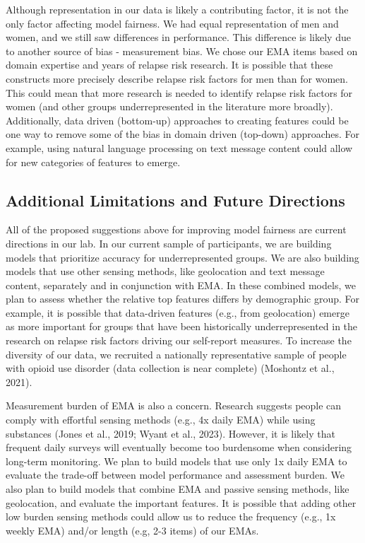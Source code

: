 \documentclass[
]{agujournal2019}
\begin{document}
Although representation in our data is likely a contributing factor, it
is not the only factor affecting model fairness. We had equal
representation of men and women, and we still saw differences in
performance. This difference is likely due to another source of bias -
measurement bias. We chose our EMA items based on domain expertise and
years of relapse risk research. It is possible that these constructs
more precisely describe relapse risk factors for men than for women.
This could mean that more research is needed to identify relapse risk
factors for women (and other groups underrepresented in the literature
more broadly). Additionally, data driven (bottom-up) approaches to
creating features could be one way to remove some of the bias in domain
driven (top-down) approaches. For example, using natural language
processing on text message content could allow for new categories of
features to emerge.

\subsection{Additional Limitations and Future
Directions}\label{additional-limitations-and-future-directions}

All of the proposed suggestions above for improving model fairness are
current directions in our lab. In our current sample of participants, we
are building models that prioritize accuracy for underrepresented
groups. We are also building models that use other sensing methods, like
geolocation and text message content, separately and in conjunction with
EMA. In these combined models, we plan to assess whether the relative
top features differs by demographic group. For example, it is possible
that data-driven features (e.g., from geolocation) emerge as more
important for groups that have been historically underrepresented in the
research on relapse risk factors driving our self-report measures. To
increase the diversity of our data, we recruited a nationally
representative sample of people with opioid use disorder (data
collection is near complete) (Moshontz et al., 2021).

Measurement burden of EMA is also a concern. Research suggests people
can comply with effortful sensing methods (e.g., 4x daily EMA) while
using substances (Jones et al., 2019; Wyant et al., 2023). However, it
is likely that frequent daily surveys will eventually become too
burdensome when considering long-term monitoring. We plan to build
models that use only 1x daily EMA to evaluate the trade-off between
model performance and assessment burden. We also plan to build models
that combine EMA and passive sensing methods, like geolocation, and
evaluate the important features. It is possible that adding other low
burden sensing methods could allow us to reduce the frequency (e.g., 1x
weekly EMA) and/or length (e.g, 2-3 items) of our EMAs.
\end{document}
